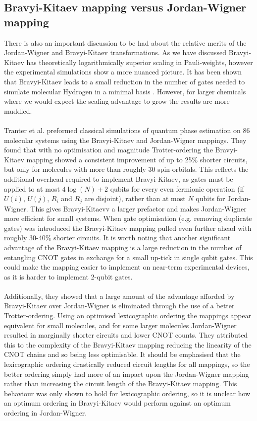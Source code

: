 \documentclass[twoside]{article}
\begin{document}
\subsection{Bravyi-Kitaev mapping versus Jordan-Wigner mapping}
There is also an important discussion to be had about the relative merits of the Jordan-Wigner and Bravyi-Kitaev transformations. As we have discussed Bravyi-Kitaev has theoretically logarithmically superior scaling in Pauli-weights, however the experimental simulations show a more nuanced picture. It has been shown that Bravyi-Kitaev leads to a small reduction in the number of gates needed to simulate molecular Hydrogen in a minimal basis \cite{seeley}. However, for larger chemicals where we would expect the scaling advantage to grow the results are more muddled.\\\\
Tranter et al. \cite{tranter2018} preformed classical simulations of quantum phase estimation on 86 molecular systems using the Bravyi-Kitaev and Jordan-Wigner mappings. They found that with no optimisation and magnitude Trotter-ordering the Bravyi-Kitaev mapping showed a consistent improvement of up to 25\% shorter circuits, but only for molecules with more than roughly 30 spin-orbitals. This reflects the additional overhead required to implement Bravyi-Kitaev, as gates must be applied to at most $4 \log(N)+2$ qubits for every even fermionic operation (if $U(i)$, $U(j)$, $R_i$ and $R_j$ are disjoint), rather than at most $N$ qubits for Jordan-Wigner. This gives Bravyi-Kitaevv a larger prefactor and makes Jordan-Wigner more efficient for small systems. When gate optimisation (e.g. removing duplicate gates)  was introduced the Bravyi-Kitaev mapping pulled even further ahead with roughly 30-40\% shorter circuits. It is worth noting that another significant advantage of the Bravyi-Kitaev mapping is a large reduction in the number of entangling CNOT gates in exchange for a small up-tick in single qubit gates. This could make the mapping easier to implement on near-term experimental devices, as it is harder to implement 2-qubit gates.
\\\\Additionally, they showed that a large amount of the advantage afforded by Bravyi-Kitaev over Jordan-Wigner is eliminated through the use of a better Trotter-ordering. Using an optimised lexicographic ordering the mappings appear equivalent for small molecules, and for some larger molecules Jordan-Wigner resulted in marginally shorter circuits and lower CNOT counts. They attributed this to the complexity of the Bravyi-Kitaev mapping reducing the linearity of the CNOT chains and so being less optimisable. It should be emphasised that the lexicographic ordering drastically reduced circuit lengths for all mappings, so the better ordering simply had more of an impact upon the Jordan-Wigner mapping rather than increasing the circuit length of the Bravyi-Kitaev mapping. This behaviour was only shown to hold for lexicographic ordering, so it is unclear how an optimum ordering in Bravyi-Kitaev would perform against an optimum ordering in Jordan-Wigner.\\\\
\end{document}
